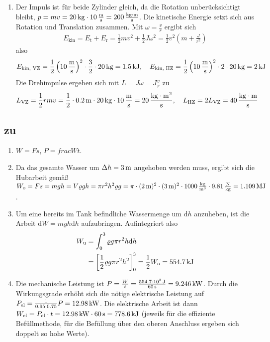 \documentclass[a4paper]{scrartcl}
\begin{document}
\begin{enumerate}[noitemsep]
  \item 
    Der Impuls ist für beide Zylinder gleich, da die Rotation unberücksichtigt bleibt, $p = mv = \unit[20]{kg} \cdot \unit[10]{\frac{m}{s}} = \unit[200]{\frac{kg \cdot m}{s}}$.
    Die kinetische Energie setzt sich aus Rotation und Translation zusammen. Mit $\omega = \frac{v}{r}$ ergibt sich
    \begin{align*}
      E_\text{kin} = E_\text{t} + E_\text{r} = \frac{1}{2}mv^2 + \frac{1}{2}J\omega^2 = \frac{1}{2}v^2 \left( m+\frac{J}{r^2} \right)
    \end{align*}
    also
    \begin{align*}
      E_\text{kin, VZ} = \frac{1}{2} \left(\unit[10]{\frac{m}{s}}\right)^2 \cdot \frac{3}{2}\cdot \unit[20]{kg} = \unit[1.5]{kJ},\quad E_\text{kin, HZ} = \frac{1}{2} \left(\unit[10]{\frac{m}{s}}\right)^2 \cdot 2\cdot \unit[20]{kg} = \unit[2]{kJ}
    \end{align*}
    Die Drehimpulse ergeben sich mit $L = J\omega = J\frac{v}{r}$ zu
    \begin{align*}
      L_\text{VZ} = \frac{1}{2} rmv = \frac{1}{2}\cdot \unit[0.2]{m} \cdot \unit[20]{kg} \cdot \unit[10]{\frac{m}{s}} = \unit[20]{\frac{kg\cdot m^2}{s}}, \quad L_\text{HZ} = 2L_\text{VZ} = \unit[40]{\frac{kg\cdot m}{s}}
    \end{align*}
\end{enumerate}


\subsection{zu }
\label{lsg:Wassertank}
\begin{enumerate}[noitemsep]
  \item $W = Fs$, $P = frac{W}{t}$.
  \item Da das gesamte Wasser um $\Delta h = \unit[3]{m}$ angehoben werden muss, ergibt sich die Hubarbeit gemäß $W_\text{o} = Fs = mgh = V\varrho g h = \pi r^2 h^2 \varrho g = \pi \cdot (\unit[2]{m})^2 \cdot (\unit[3]{m})^2 \cdot \unit[1000]{\frac{kg}{m^3}}\cdot \unit[9.81]{\frac{N}{kg}} = \unit[1.109]{MJ}$.
  \item Um eine bereits im Tank befindliche Wassermenge um $\text{d}h$ anzuheben, ist die Arbeit $\text{d}W = mgh \text{d}h$ aufzubringen. Aufintegriert also
    \begin{align*}
      W_\text{u} &= \int_0^3 \varrho g \pi r^2 h \text{d}h \\
      &= \left[ \frac{1}{2} \varrho g \pi  r^2 h^2 \right]_0^3 = \frac{1}{2} W_\text{o} = \unit[554.7]{kJ}
    \end{align*}
  \item Die mechanische Leistung ist $P = \frac{W}{t} = \frac{\unit[554.7 \cdot 10^3]{J}}{\unit[60]{s}} = \unit[9.246]{kW}$. Durch die Wirkungsgrade erhöht sich die nötige elektrische Leistung auf $P_\text{el} = \frac{1}{0.95 \cdot 0.75} P = \unit[12.98]{kW}$. Die elektrische Arbeit ist dann $W_\text{el} = P_\text{el} \cdot t = \unit[12.98]{kW} \cdot \unit[60]{s} = \unit[778.6]{kJ}$ (jeweils für die effiziente Befüllmethode, für die Befüllung über den oberen Anschluss ergeben sich doppelt so hohe Werte).
\end{enumerate}
\end{document}
